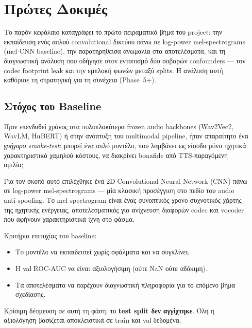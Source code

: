 \chapter{Πρώτες Δοκιμές}
\label{chap:protes-dokimes}

Το παρόν κεφάλαιο καταγράφει το πρώτο πειραματικό βήμα του project:
την εκπαίδευση ενός απλού convolutional δικτύου πάνω σε
log-power mel-spectrograms (mel-CNN baseline), την παρατηρηθείσα ανωμαλία
στα αποτελέσματα, και τη διαγνωστική ανάλυση που οδήγησε στον εντοπισμό
δύο σοβαρών confounders — τον codec footprint leak και την εμπλοκή φωνών
μεταξύ splits.
Η ανάλυση αυτή καθόρισε τη στρατηγική για τη συνέχεια (Phase~5+).

\section{Στόχος του Baseline}
\label{sec:mel-baseline-goal}

Πριν επενδυθεί χρόνος στα πολυπλοκότερα frozen audio backbones
(Wav2Vec2, WavLM, HuBERT) ή στην ανάπτυξη του multimodal pipeline,
ήταν απαραίτητο ένα \emph{γρήγορο smoke-test}: μπορεί ένα απλό μοντέλο,
που λαμβάνει ως είσοδο μόνο ηχητικά χαρακτηριστικά χαμηλού κόστους,
να διακρίνει bonafide από TTS-παραγόμενη ομιλία;

Για τον σκοπό αυτό επιλέχθηκε ένα 2D Convolutional Neural Network (CNN)
πάνω σε log-power mel-spectrograms — μία κλασική προσέγγιση στο πεδίο
του audio anti-spoofing.
Το mel-spectrogram είναι ένας συνοπτικός χρονο-συχνοτικός χάρτης
της ηχητικής ενέργειας, αποτελεσματικός για ανίχνευση διαφορών codec
και vocoder που αφήνουν χαρακτηριστικά ίχνη στο φάσμα.

Κριτήρια επιτυχίας του baseline:
\begin{itemize}
  \item Το μοντέλο να εκπαιδευτεί χωρίς σφάλματα και να συγκλίνει.
  \item Η val ROC-AUC να είναι αξιολογήσιμη (ούτε NaN ούτε αδόκιμη).
  \item Τα αποτελέσματα να παρέχουν διαγνωστική πληροφορία για το
        επόμενο βήμα σχεδίασης.
\end{itemize}

Κρίσιμη δέσμευση σε αυτή τη φάση: το \textbf{test split δεν αγγίχτηκε}.
Όλη η αξιολόγηση βασίζεται αποκλειστικά σε train και val δεδομένα.

